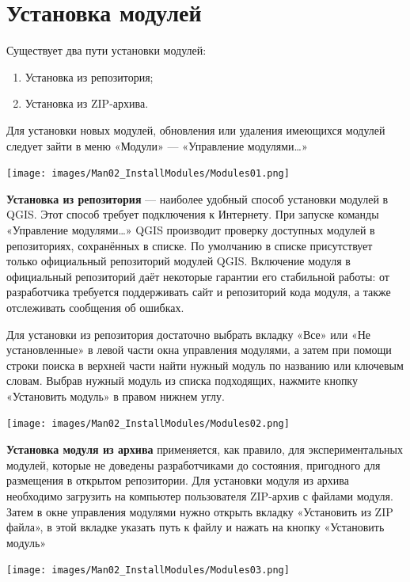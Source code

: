 \documentclass[
  12pt,
]{book}
\begin{document}
\hypertarget{manual-plugins-install}{%
\section{Установка модулей}\label{manual-plugins-install}}

Существует два пути установки модулей:

\begin{enumerate}
\def\labelenumi{\arabic{enumi}.}
\item
  Установка из репозитория;
\item
  Установка из ZIP-архива.
\end{enumerate}

Для установки новых модулей, обновления или удаления имеющихся модулей следует зайти в меню «Модули» --- «Управление модулями\ldots»

\texttt{[image: images/Man02\_InstallModules/Modules01.png]}

\textbf{Установка из репозитория} --- наиболее удобный способ установки модулей в QGIS. Этот способ требует подключения к Интернету. При запуске команды «Управление модулями\ldots» QGIS производит проверку доступных модулей в репозиториях, сохранённых в списке. По умолчанию в списке присутствует только официальный репозиторий модулей QGIS. Включение модуля в официальный репозиторий даёт некоторые гарантии его стабильной работы: от разработчика требуется поддерживать сайт и репозиторий кода модуля, а также отслеживать сообщения об ошибках.

Для установки из репозитория достаточно выбрать вкладку «Все» или «Не установленные» в левой части окна управления модулями, а затем при помощи строки поиска в верхней части найти нужный модуль по названию или ключевым словам. Выбрав нужный модуль из списка подходящих, нажмите кнопку «Установить модуль» в правом нижнем углу.

\texttt{[image: images/Man02\_InstallModules/Modules02.png]}

\textbf{Установка модуля из архива} применяется, как правило, для экспериментальных модулей, которые не доведены разработчиками до состояния, пригодного для размещения в открытом репозитории.
Для установки модуля из архива необходимо загрузить на компьютер пользователя ZIP-архив с файлами модуля. Затем в окне управления модулями нужно открыть вкладку «Установить из ZIP файла», в этой вкладке указать путь к файлу и нажать на кнопку «Установить модуль»

\texttt{[image: images/Man02\_InstallModules/Modules03.png]}
\end{document}
